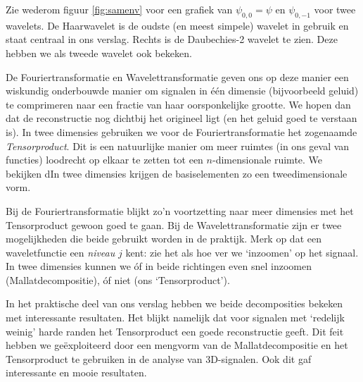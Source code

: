 Zie wederom figuur \ref{fig:samenv} voor een grafiek van $\psi_{0,0} = \psi$ en $\psi_{0,-1}$ voor twee wavelets. De Haarwavelet is de oudste (en meest simpele) wavelet in gebruik en staat centraal in ons verslag. Rechts is de Daubechies-2 wavelet te zien. Deze hebben we als tweede wavelet ook bekeken.

De Fouriertransformatie en Wavelettransformatie geven ons op deze manier een wiskundig onderbouwde manier om signalen in \'e\'en dimensie (bijvoorbeeld geluid) te comprimeren naar een fractie van haar oorsponkelijke grootte. We hopen dan dat de reconstructie nog dichtbij het origineel ligt (en het geluid goed te verstaan is). In twee dimensies gebruiken we voor de Fouriertransformatie het zogenaamde \emph{Tensorproduct}. Dit is een natuurlijke manier om meer ruimtes (in ons geval van functies) loodrecht op elkaar te zetten tot een $n$-dimensionale ruimte. We bekijken dIn twee dimensies krijgen de basiselementen zo een tweedimensionale vorm.

Bij de Fouriertransformatie blijkt zo'n voortzetting naar meer dimensies met het Tensorproduct gewoon goed te gaan. Bij de Wavelettransformatie zijn er twee mogelijkheden die beide gebruikt worden in de praktijk. Merk op dat een waveletfunctie een \emph{niveau} $j$ kent: zie het als hoe ver we `inzoomen' op het signaal. In twee dimensies kunnen we \'of in beide richtingen even snel inzoomen (Mallatdecompositie), \'of niet (ons `Tensorproduct').

In het praktische deel van ons verslag hebben we beide decomposities bekeken met interessante resultaten. Het blijkt namelijk dat voor signalen met `redelijk weinig' harde randen het Tensorproduct een goede reconstructie geeft. Dit feit hebben we ge\"exploiteerd door een mengvorm van de Mallatdecompositie en het Tensorproduct te gebruiken in de analyse van 3D-signalen. Ook dit gaf interessante en mooie resultaten.

